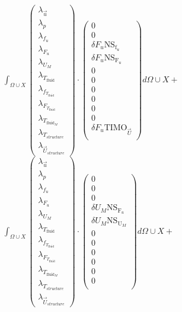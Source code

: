 \documentclass[10pt]{article} %
\begin{document}
\begin{center}
	$\int_{\Omega \cup X}
	\begin{pmatrix}
		\lambda_{\vec{u}} \\ \lambda_p \\ \lambda_{f_u} \\ \lambda_{F_u} \\ \lambda_{U_M}\\ \lambda_{T_{\text{fluid}}} \\ \lambda_{f_{T_{\text{fluid}}}} \\ \lambda_{F_{T_{\text{fluid}}}} \\ \lambda_{T_{\text{fluid}_M}} \\ \lambda_{T_{structure}} \\ \lambda_{\vec{U}_{structure}}
	\end{pmatrix}
	\cdot
	\begin{pmatrix}
		0\\
		0\\
		\delta F_u \text{NS}_{\text{f}_u} \\
		\delta F_u \text{NS}_{\text{F}_u} \\
		0\\
		0\\
		0\\
		0\\
		0\\
		0\\
		\delta F_u \text{TIMO}_{\vec{U}}\\
	\end{pmatrix}
	d\Omega \cup X + $\\

	$\int_{\Omega \cup X}
	\begin{pmatrix}
		\lambda_{\vec{u}} \\ \lambda_p \\ \lambda_{f_u} \\ \lambda_{F_u} \\ \lambda_{U_M}\\ \lambda_{T_{\text{fluid}}} \\ \lambda_{f_{T_{\text{fluid}}}} \\ \lambda_{F_{T_{\text{fluid}}}} \\ \lambda_{T_{\text{fluid}_M}} \\ \lambda_{T_{structure}} \\ \lambda_{\vec{U}_{structure}}
	\end{pmatrix}
	\cdot
	\begin{pmatrix}
		0 \\
		0\\
		0 \\
		\delta U_M \text{NS}_{\text{F}_u} \\
		\delta U_M \text{NS}_{\text{U}_M} \\
		0 \\
		0\\
		0\\
		0\\
		0\\
		0\\
	\end{pmatrix}
	d\Omega \cup X + $\\


\end{center}
\end{document}
